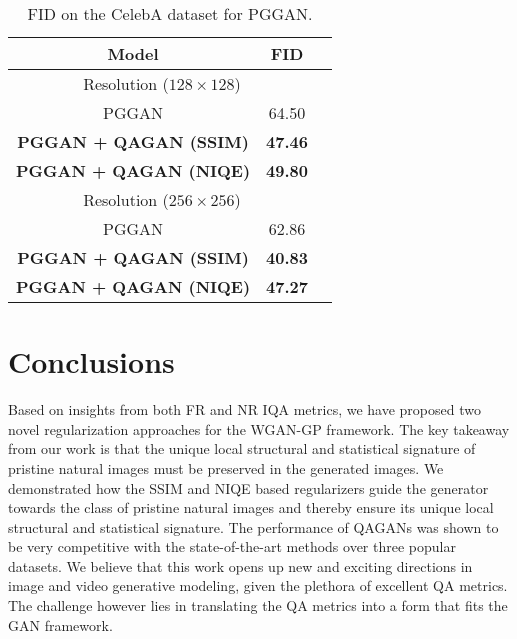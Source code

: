 \documentclass{article}
\begin{document}
\begin{table}[htbp]
\begin{center}
 \caption{FID on the CelebA dataset for PGGAN.}
 \label{tab:celeba_pggan}


  \begin{tabular}{|c|c|c|}
\hline
      {\bf{Model}} & {\bf{FID}} 

      \\
      \hline
        \multicolumn{2}{|c|}{{Resolution ($128 \times 128$)}}\\
\hline
     
     PGGAN \cite{karras2018progressive} &   {64.50} \\

      \hline
     
     \textbf{PGGAN + QAGAN (SSIM)} &   \textbf{47.46} \\\hline
     \textbf{PGGAN + QAGAN (NIQE)} &   \textbf{49.80}\\\hline
      \multicolumn{2}{|c|}{{Resolution ($256 \times 256$)}} \\
     \hline
     {PGGAN \cite{karras2018progressive}} &   {62.86} \\

      \hline
     
     \textbf{PGGAN + QAGAN (SSIM)} &   \textbf{40.83} \\\hline
     \textbf{PGGAN + QAGAN (NIQE)} &   \textbf{47.27}\\\hline
     
  \end{tabular}
\end{center}
\end{table}

\section{Conclusions}
Based on insights from both FR and NR IQA metrics, we have proposed two novel regularization approaches for the WGAN-GP framework. The key takeaway from our work is that the unique local structural and statistical signature of pristine natural images must be preserved in the generated images. We demonstrated how the SSIM and NIQE based regularizers guide the generator towards the class of pristine natural images and thereby ensure its unique local structural and statistical signature. The performance of QAGANs was shown to be very competitive with the state-of-the-art methods over three popular datasets. We believe that this work opens up new and exciting directions in image and video generative modeling, given the plethora of excellent QA metrics. The challenge however lies in translating the QA metrics into a form that fits the GAN framework.
\end{document}
